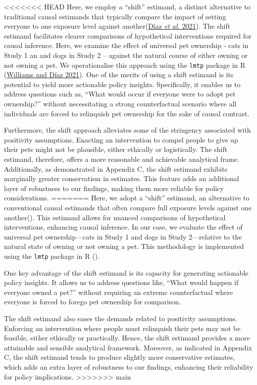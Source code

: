 \documentclass[
  singlecolumn,
  9pt]{article}
\begin{document}
<<<<<<< HEAD
Here, we employ a ``shift'' estimand, a distinct alternative to
traditional causal estimands that typically compare the impact of
setting everyone to one exposure level against
another(\hyperref[ref-duxedaz2021]{Díaz \emph{et al.} 2021}). The shift
estimand facilitates clearer comparisons of hypothetical interventions
required for causal inference. Here, we examine the effect of universal
pet ownership - cats in Study 1 an and dogs in Study 2 -- against the
natural course of either owning or not owning a pet. We operationalise
this approach using the \texttt{lmtp} package in R
(\hyperref[ref-williams2021]{Williams and Díaz 2021}). One of the merits
of using a shift estimand is its potential to yield more actionable
policy insights. Specifically, it enables us to address questions such
as, ``What would occur if everyone were to adopt pet ownership?''
without necessitating a strong counterfactual scenario where all
individuals are forced to relinquish pet ownership for the sake of
causal contrast.

Furthermore, the shift approach alleviates some of the stringency
associated with positivity assumptions. Enacting an intervention to
compel people to give up their pets might not be plausible, either
ethically or logistically. The shift estimand, therefore, offers a more
reasonable and achievable analytical frame. Additionally, as
demonstrated in Appendix C, the shift estimand exhibits marginally
greater conservatism in estimates. This feature adds an additional layer
of robustness to our findings, making them more reliable for policy
considerations.
=======
Here, we adopt a ``shift'' estimand, an alternative to conventional
causal estimands that often compare full exposure levels against one
another(). This
estimand allows for nuanced comparisons of hypothetical interventions,
enhancing causal inference. In our case, we evaluate the effect of
universal pet ownership---cats in Study 1 and dogs in Study 2---relative
to the natural state of owning or not owning a pet. This methodology is
implemented using the \texttt{lmtp} package in R
().

One key advantage of the shift estimand is its capacity for generating
actionable policy insights. It allows us to address questions like,
``What would happen if everyone owned a pet?'' without requiring an
extreme counterfactual where everyone is forced to forego pet ownership
for comparison.

The shift estimand also eases the demands related to positivity
assumptions. Enforcing an intervention where people must relinquish
their pets may not be feasible, either ethically or practically. Hence,
the shift estimand provides a more attainable and sensible analytical
framework. Moreover, as indicated in Appendix C, the shift estimand
tends to produce slightly more conservative estimates, which adds an
extra layer of robustness to our findings, enhancing their reliability
for policy implications.
>>>>>>> main
\end{document}
